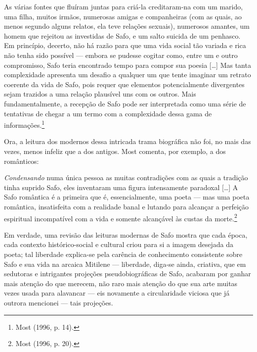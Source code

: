 \begin{hedraquote}
As várias fontes que fluíram juntas para criá-la creditaram-na com um marido,
uma filha, muitos irmãos, numerosas amigas e companheiras (com as quais, ao
menos segundo alguns relatos, ela teve relações sexuais), numerosos amantes, um
homem que rejeitou as investidas de Safo, e um salto suicida de um penhasco. Em
princípio, decerto, não há razão para que uma vida social tão variada e rica
não tenha sido possível --- embora se pudesse cogitar como, entre um e outro
compromisso, Safo teria encontrado tempo para compor sua poesia [\ldots{}] Mas tanta
complexidade apresenta um desafio a qualquer um que tente imaginar um retrato
coerente da vida de Safo, pois requer que elementos potencialmente divergentes
sejam trazidos a uma relação plausível uns com os outros. Mais
fundamentalmente, a recepção de Safo pode ser interpretada como uma série de
tentativas de chegar a um termo com a complexidade dessa gama de informações.\footnote{ Most (1996, p. 14).}
\end{hedraquote}

Ora, a leitura dos modernos dessa intricada trama biográfica não foi, no mais
das vezes, menos infeliz que a dos antigos. Most comenta, por exemplo,
a dos românticos:

\begin{hedraquote}
\textit{Condensando} numa única pessoa as muitas contradições com as quais a
tradição tinha suprido Safo, eles inventaram uma figura intensamente paradoxal
[\ldots{}] A Safo romântica é a primeira que é, essencialmente, uma poeta --- mas uma
poeta romântica, insatisfeita com a realidade banal e lutando para alcançar a
perfeição espiritual incompatível com a vida e somente alcançável às custas da
morte.\footnote{ Most (1996, p. 20).}
\end{hedraquote}

Em verdade, uma revisão das leituras modernas de Safo mostra que cada época,
cada contexto histórico-social e cultural criou para si a imagem desejada da
poeta; tal liberdade explica-se pela carência de conhecimento consistente sobre
Safo e sua vida na arcaica Mitilene --- liberdade, diga-se ainda, criativa, que
em sedutoras e intrigantes projeções pseudobiográficas de Safo, acabaram por
ganhar mais atenção do que merecem, não raro mais atenção do que sua arte
muitas vezes usada para alavancar --- eis novamente a circularidade viciosa que
já outrora mencionei --- tais projeções. 

